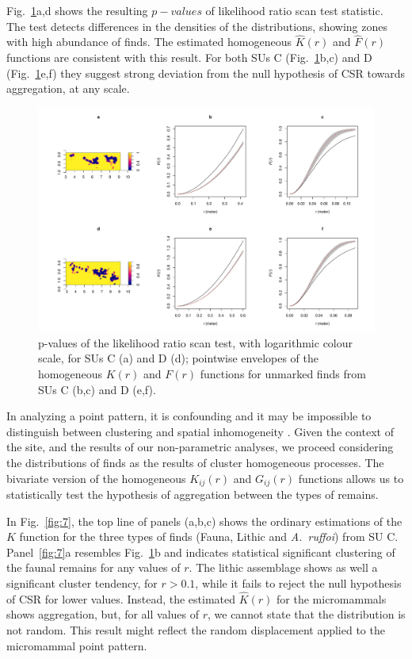 \documentclass[5p,authoryear]{elsarticle} %
\begin{document}
Fig.~\ref{fig:6}a,d shows the resulting $p-values$ of likelihood ratio scan test statistic. The test detects differences in the densities of the distributions, showing zones with high abundance of finds. The estimated homogeneous $\hat K(r)$ and $\hat F(r)$ functions are consistent with this result. For both SUs C (Fig.~\ref{fig:6}b,c) and D (Fig.~\ref{fig:6}e,f) they suggest strong deviation from the null hypothesis of CSR towards aggregation, at any scale.

\begin{figure}[t]
  \centering
  \includegraphics[width=1\textwidth]{../artwork/Fig6.pdf}
  \caption{p-values of the likelihood ratio scan test, with logarithmic colour scale, for SUs C (a) and D (d); pointwise envelopes of the homogeneous $K(r)$ and $F(r)$ functions for unmarked finds from SUs C (b,c) and D (e,f).}
  \label{fig:6}
\end{figure}

In analyzing a point pattern, it is confounding and it may be impossible to distinguish between clustering and spatial inhomogeneity \citep{Baddeley2015}. Given the context of the site, and the results of our non-parametric analyses, we proceed considering the distributions of finds as the results of cluster homogeneous processes. The bivariate version of the homogeneous $K_{ij}(r)$ and $G_{ij}(r)$ functions allows us to statistically test the hypothesis of aggregation between the types of remains.

In Fig.~\ref{fig:7}, the top line of panels (a,b,c) shows the ordinary estimations of the $K$ function for the three types of finds (Fauna, Lithic and \emph{A.~ruffoi}) from SU C. Panel~\ref{fig:7}a resembles Fig.~\ref{fig:6}b and indicates statistical significant clustering of the faunal remains for any values of $r$. The lithic assemblage shows as well a significant cluster tendency, for $r>0.1$, while it fails to reject the null hypothesis of CSR for lower values. Instead, the estimated $\hat{K}(r)$ for the micromammals shows aggregation, but, for all values of $r$, we cannot state that the distribution is not random. This result might reflect the random displacement applied to the micromammal point pattern.
\end{document}
